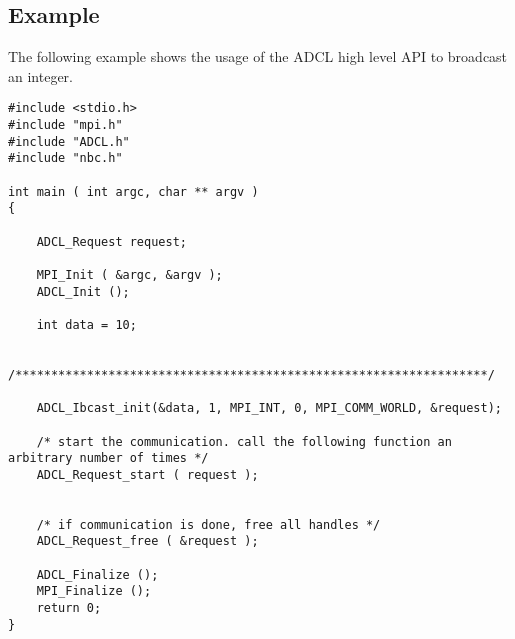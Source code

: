 \subsection{Example}

The following example shows the usage of the ADCL high level API to broadcast an integer.

\begin{verbatim}
#include <stdio.h>
#include "mpi.h"
#include "ADCL.h"
#include "nbc.h"

int main ( int argc, char ** argv ) 
{
    
    ADCL_Request request;

    MPI_Init ( &argc, &argv );
    ADCL_Init ();
    
    int data = 10;
    
    /******************************************************************/

    ADCL_Ibcast_init(&data, 1, MPI_INT, 0, MPI_COMM_WORLD, &request);
    
    /* start the communication. call the following function an arbitrary number of times */ 
    ADCL_Request_start ( request );


    /* if communication is done, free all handles */
    ADCL_Request_free ( &request );
    
    ADCL_Finalize ();
    MPI_Finalize ();
    return 0;
}
\end{verbatim}
